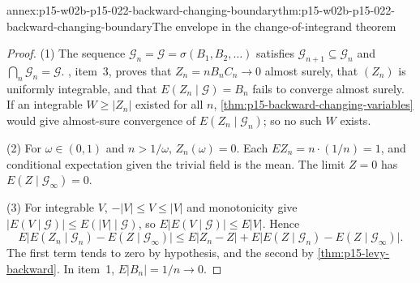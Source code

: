 \begin{annexitem}{annex:p15-w02b-p15-022-backward-changing-boundary}{thm:p15-w02b-p15-022-backward-changing-boundary}{The envelope in the change-of-integrand theorem}
\begin{proof}
(1) The sequence \(\mathcal G_n=\mathcal G=\sigma(B_1,B_2,\ldots)\)
satisfies \(\mathcal G_{n+1}\subseteq\mathcal G_n\) and
\(\bigcap_n\mathcal G_n=\mathcal G\). ,
item~3, proves that \(Z_n=nB_nC_n\to0\) almost surely, that \((Z_n)\) is
uniformly integrable, and that \(E(Z_n\mid\mathcal G)=B_n\) fails to
converge almost surely. If an integrable \(W\geq|Z_n|\) existed for all
\(n\), \cref{thm:p15-backward-changing-variables} would give almost-sure
convergence of \(E(Z_n\mid\mathcal G_n)\); so no such \(W\) exists.

(2) For \(\omega\in(0,1)\) and \(n>1/\omega\), \(Z_n(\omega)=0\). Each
\(EZ_n=n\cdot(1/n)=1\), and conditional expectation given the trivial field
is the mean. The limit \(Z=0\) has \(E(Z\mid\mathcal G_\infty)=0\).

(3) For integrable \(V\), \(-|V|\leq V\leq|V|\) and monotonicity give
\(|E(V\mid\mathcal G)|\leq E(|V|\mid\mathcal G)\), so
\(E|E(V\mid\mathcal G)|\leq E|V|\). Hence
\[
 E\bigl|E(Z_n\mid\mathcal G_n)-E(Z\mid\mathcal G_\infty)\bigr|
   \leq E|Z_n-Z|+E\bigl|E(Z\mid\mathcal G_n)-E(Z\mid\mathcal G_\infty)\bigr|.
\]
The first term tends to zero by hypothesis, and the second by
\cref{thm:p15-levy-backward}. In item~1, \(E|B_n|=1/n\to0\).
\end{proof}
\end{annexitem}

